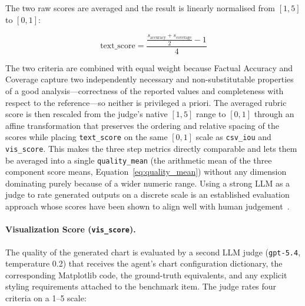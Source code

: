 \noindent The two raw scores are averaged and the result is linearly normalised from
$[1, 5]$ to $[0, 1]$:

\begin{equation}
    \text{text\_score} = \frac{\frac{s_{\text{accuracy}} + s_{\text{coverage}}}{2} - 1}{4}
    \label{eq:textscore}
\end{equation}

\noindent The two criteria are combined with equal weight because Factual
Accuracy and Coverage capture two independently necessary and
non-substitutable properties of a good analysis---correctness of the reported
values and completeness with respect to the reference---so neither is
privileged a priori. The averaged rubric score is then rescaled from the
judge's native $[1,5]$ range to $[0,1]$ through an affine transformation
that preserves the ordering and relative spacing of the scores while placing
\texttt{text\_score} on the same $[0,1]$ scale as \texttt{csv\_iou} and
\texttt{vis\_score}. This makes the three step metrics directly comparable and
lets them be averaged into a single \texttt{quality\_mean} (the arithmetic mean
of the three component score means, Equation~\ref{eq:quality_mean}) without any
dimension dominating purely because of a wider numeric range. Using a strong LLM as a judge to rate
generated outputs on a discrete scale is an established evaluation approach
whose scores have been shown to align well with human
judgement~\cite{zheng2023judging}.

\paragraph{Visualization Score (\texttt{vis\_score}).}
The quality of the generated chart is evaluated by a second LLM judge (\texttt{gpt-5.4}, temperature 0.2) that receives
the agent's chart configuration dictionary, the corresponding Matplotlib code, the
ground-truth equivalents, and any explicit styling requirements attached to the
benchmark item. The judge rates four criteria on a 1--5 scale:

